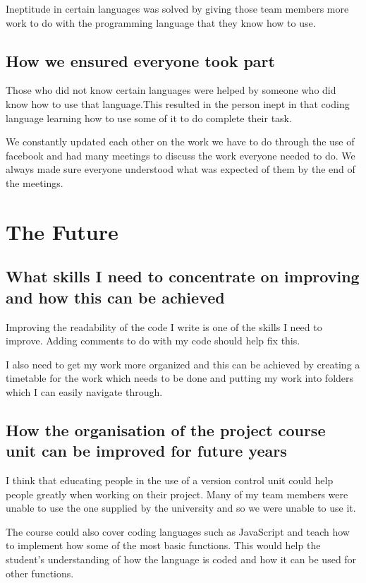 \documentclass[12pt,a4paper]{article}
\begin{document}
Ineptitude in certain languages was solved by giving those team members more work to do with 
the programming language that they know how to use.

\subsection{How we ensured everyone took part}

Those who did not know certain languages were helped by someone who did know how to use
that language.This resulted in the person inept in that coding language learning how to use 
some of it to do complete their task.

We constantly updated each other on the work we have to do through the use of facebook and
had many meetings to discuss the work everyone needed to do. We always made sure everyone understood
what was expected of them by the end of the meetings.

\newpage
\section{The Future}

\subsection{What skills I need to concentrate on improving and how this can be achieved}

Improving the readability of the code I write is one of the skills I need to improve.
Adding comments to do with my code should help fix this.

I also need to get my work more organized and this can be achieved by creating a timetable 
for the work which needs to be done and putting my work into folders which I can easily navigate through.

\subsection{How the organisation of the project course unit can be improved for future years}

I think that educating people in the use of a version control unit could help people greatly
when working on their project. Many of my team members were unable to use the one supplied by the
university and so we were unable to use it.

The course could also cover coding languages such as JavaScript and teach how to implement how some
of the most basic functions. This would help the student's understanding of how the language is coded
and how it can be used for other functions.
\end{document}
